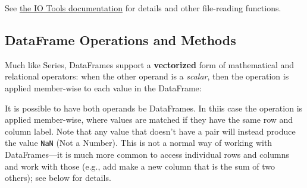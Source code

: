 \documentclass[]{book}
\newenvironment{Shaded}{\begin{snugshade}}{\end{snugshade}}
\newcommand{\DecValTok}[1]{\textcolor[rgb]{0.00,0.00,0.81}{#1}}
\newcommand{\FloatTok}[1]{\textcolor[rgb]{0.00,0.00,0.81}{#1}}
\newcommand{\StringTok}[1]{\textcolor[rgb]{0.31,0.60,0.02}{#1}}
\newcommand{\CommentTok}[1]{\textcolor[rgb]{0.56,0.35,0.01}{\textit{#1}}}
\newcommand{\OperatorTok}[1]{\textcolor[rgb]{0.81,0.36,0.00}{\textbf{#1}}}
\newcommand{\BuiltInTok}[1]{#1}
\newcommand{\NormalTok}[1]{#1}
\begin{document}
See \href{http://pandas.pydata.org/pandas-docs/stable/io.html}{the IO
Tools documentation} for details and other file-reading functions.

\hypertarget{dataframe-operations-and-methods}{\subsection{DataFrame
Operations and Methods}\label{dataframe-operations-and-methods}}

Much like Series, DataFrames support a \textbf{vectorized} form of
mathematical and relational operators: when the other operand is a
\emph{scalar}, then the operation is applied member-wise to each value
in the DataFrame:

\begin{Shaded}
\end{Shaded}

It is possible to have both operands be DataFrames. In thiis case the
operation is applied member-wise, where values are matched if they have
the same row and column label. Note that any value that doesn't have a
pair will instead produce the value \texttt{NaN} (Not a Number). This is
not a normal way of working with DataFrames---it is much more common to
access individual rows and columns and work with those (e.g., add make a
new column that is the sum of two others); see below for details.
\end{document}
